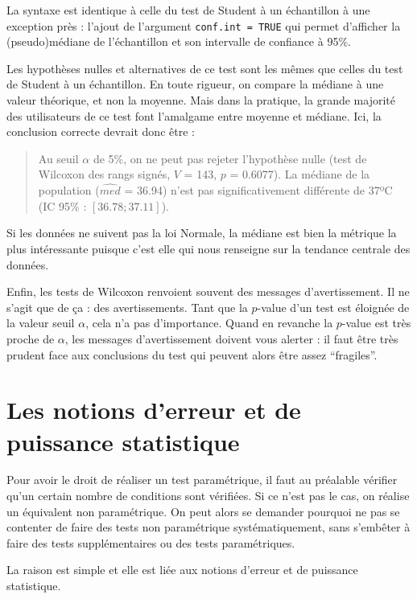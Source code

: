 \documentclass[
  a4paper,
  DIV=11,
  numbers=noendperiod,
  oneside]{scrreprt}
\begin{document}
La syntaxe est identique à celle du test de Student à un échantillon à
une exception près : l'ajout de l'argument \texttt{conf.int\ =\ TRUE}
qui permet d'afficher la (pseudo)médiane de l'échantillon et son
intervalle de confiance à 95\%.

Les hypothèses nulles et alternatives de ce test sont les mêmes que
celles du test de Student à un échantillon. En toute rigueur, on compare
la médiane à une valeur théorique, et non la moyenne. Mais dans la
pratique, la grande majorité des utilisateurs de ce test font l'amalgame
entre moyenne et médiane. Ici, la conclusion correcte devrait donc être
:

\begin{quote}
Au seuil \(\alpha\) de 5\%, on ne peut pas rejeter l'hypothèse nulle
(test de Wilcoxon des rangs signés, \(V\) = 143, \(p\) = 0.6077). La
médiane de la population (\(\widehat{med}\) = 36.94) n'est pas
significativement différente de 37ºC (IC 95\% : \([36.78 ; 37.11]\)).
\end{quote}

Si les données ne suivent pas la loi Normale, la médiane est bien la
métrique la plus intéressante puisque c'est elle qui nous renseigne sur
la tendance centrale des données.

Enfin, les tests de Wilcoxon renvoient souvent des messages
d'avertissement. Il ne s'agit que de ça : des avertissements. Tant que
la \(p\)-value d'un test est éloignée de la valeur seuil \(\alpha\),
cela n'a pas d'importance. Quand en revanche la \(p\)-value est très
proche de \(\alpha\), les messages d'avertissement doivent vous alerter
: il faut être très prudent face aux conclusions du test qui peuvent
alors être assez ``fragiles''.

\hypertarget{sec-puiss}{%
\section{Les notions d'erreur et de puissance
statistique}\label{sec-puiss}}

Pour avoir le droit de réaliser un test paramétrique, il faut au
préalable vérifier qu'un certain nombre de conditions sont vérifiées. Si
ce n'est pas le cas, on réalise un équivalent non paramétrique. On peut
alors se demander pourquoi ne pas se contenter de faire des tests non
paramétrique systématiquement, sans s'embêter à faire des tests
supplémentaires ou des tests paramétriques.

La raison est simple et elle est liée aux notions d'erreur et de
puissance statistique.
\end{document}
